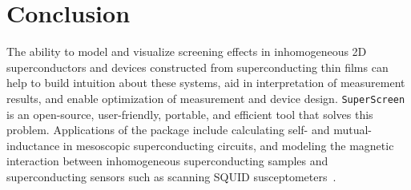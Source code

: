 \documentclass[final,3p,times]{elsarticle}
\newcommand{\inline}[1]{\texttt{#1}\xspace}
\newcommand{\SuperScreen}{\inline{SuperScreen}}
\begin{document}

\section{Conclusion}
\label{section:conlusion}

The ability to model and visualize screening effects in inhomogeneous 2D superconductors and devices constructed from superconducting thin films can help to build intuition about these systems, aid in interpretation of measurement results, and enable optimization of measurement and device design. \SuperScreen is an open-source, user-friendly, portable, and efficient tool that solves this problem. Applications of the package include calculating self- and mutual-inductance in mesoscopic superconducting circuits, and modeling the magnetic interaction between inhomogeneous superconducting samples and superconducting sensors such as scanning SQUID susceptometers~\cite{kirtley_scanning_2016}.
\end{document}
